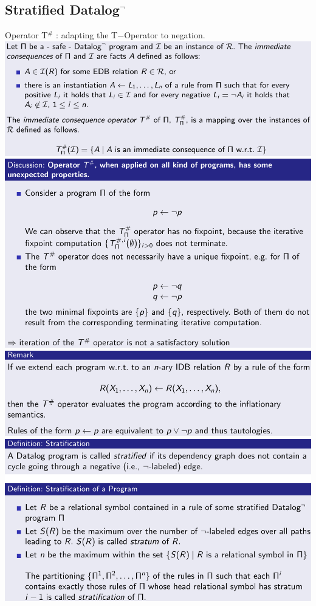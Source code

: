 \documentclass{article}
\begin{document}
\subsection{Stratified Datalog$^\neg$}
Operator T$^\#$ : adapting the T$-$Operator to negation.\\
\includegraphics[scale=0.3]{93.png}\\
\includegraphics[scale=0.3]{94.png}\\
\includegraphics[scale=0.3]{95.png}\\
\includegraphics[scale=0.3]{96.png}\\
\end{document}
